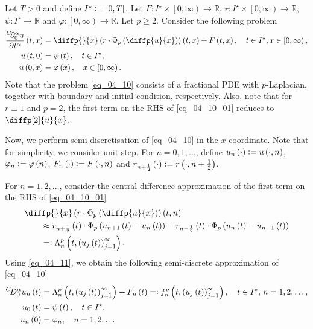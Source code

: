 \documentclass[reqno]{amsart}
\numberwithin{equation}{section}
\theoremstyle{definition}
\theoremstyle{remark}
\newcommand{\br}[1]{\left(#1\right)}
\newcommand{\DC}[3]{{}^{C}\!D^{#1}_{#2}{#3}}
\newcommand{\DCp}[4]{\frac{{}^{C}\!\partial^{#1}_{#2}{#3}}{\partial{#4}^{#1}}}
\newcommand{\defeq}{\vcentcolon=}
\newcommand{\eqdef}{=\vcentcolon}
\newcommand{\lsrbr}[1]{\left[#1\right)}
\newcommand{\R}{\mathbb{R}}
\newcommand{\sbr}[1]{\left[#1\right]}
\newcommand{\sI}{I^{\star}}
\newcommand{\st}{\!:}
\begin{document}
	Let $T>0$ and define $\sI\defeq\sbr{0,T}$. Let $F\st\sI\times\lsrbr{0,\infty}\rightarrow\R$, $r\st\sI\times\lsrbr{0,\infty}\rightarrow\R$, $\psi\st\sI\rightarrow\R$ and $\varphi\st\lsrbr{0,\infty}\rightarrow\R$. Let $p\geq2$. Consider the following problem
	\begin{subequations}\label{eq_04_10}
		\begin{align}
			\DCp{\alpha}{0}{u}{t}\br{t,x}&=\diffp{}{x}\br{r\cdot\Phi_p\br{\diffp{u}{x}}}\br{t,x}+F\br{t,x},\quad{t}\in\sI,x\in\lsrbr{0,\infty},\label{eq_04_10_01}\\
			u\br{t,0}&=\psi\br{t},\quad{t}\in\sI,\\
			u\br{0,x}&=\varphi\br{x},\quad{x}\in\lsrbr{0,\infty}.
		\end{align}
	\end{subequations}
	Note that the problem \eqref{eq_04_10} consists of a fractional PDE with $p$-Laplacian, together with boundary and initial condition, respectively. Also, note that for $r\equiv1$ and $p=2$, the first term on the RHS of \eqref{eq_04_10_01} reduces to $\diffp[2]{u}{x}$.
	
	Now, we perform semi-discretisation of \eqref{eq_04_10} in the $x$-coordinate. Note that for simplicity, we consider unit step. For $n=0,1,\dots$, define $u_n\br{\cdot}\defeq{u}\br{\cdot,n}$, $\varphi_n\defeq\varphi\br{n}$, $F_n\br{\cdot}\defeq{F}\br{\cdot,n}$ and $r_{n+\frac{1}{2}}\br{\cdot}\defeq{r}\br{\cdot,n+\frac{1}{2}}$.
	
	For $n=1,2,\dots$, consider the central difference approximation of the first term on the RHS of \eqref{eq_04_10_01}
	\begin{equation}\label{eq_04_11}
		\begin{aligned}
			&\diffp{}{x}\br{r\cdot\Phi_p\br{\diffp{u}{x}}}\br{t,n}\\
			&\qquad\approx{r}_{n+\frac{1}{2}}\br{t}\cdot\Phi_p\br{u_{n+1}\br{t}-u_n\br{t}}-r_{n-\frac{1}{2}}\br{t}\cdot\Phi_p\br{u_n\br{t}-u_{n-1}\br{t}}\\
			&\qquad\eqdef\Lambda_n^p\br{t,\br{u_j\br{t}}_{j=1}^{\infty}}.
		\end{aligned}
	\end{equation}
	Using \eqref{eq_04_11}, we obtain the following semi-discrete approximation of \eqref{eq_04_10}
	\begin{subequations}\label{eq_04_12}
		\begin{align}
			\DC{\alpha}{0}{u_n}\br{t}&=\Lambda_n^p\br{t,\br{u_j\br{t}}_{j=1}^{\infty}}+F_n\br{t}\eqdef{f}_n^p\br{t,\br{u_j\br{t}}_{j=1}^{\infty}},\quad{t}\in\sI,\,n=1,2,\dots,\label{eq_04_12_01}\\
			u_0\br{t}&=\psi\br{t},\quad{t}\in\sI,\label{eq_04_12_02}\\
			u_n\br{0}&=\varphi_n,\quad{n}=1,2,\dots
		\end{align}
	\end{subequations}
	
\end{document}
